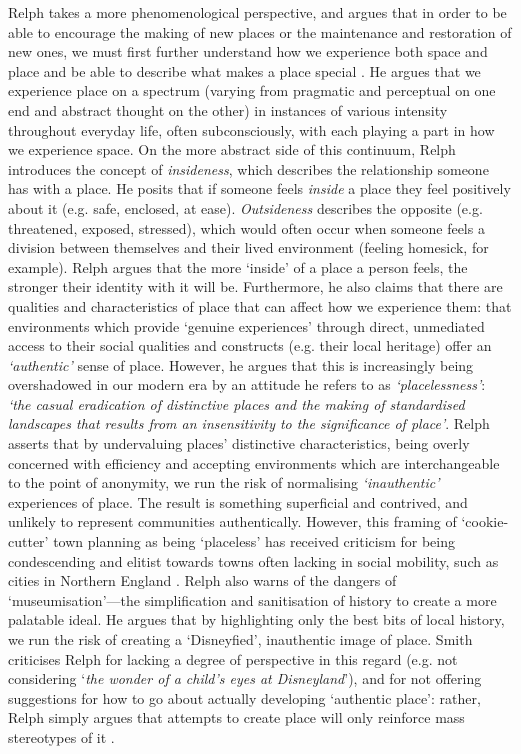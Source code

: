 Relph takes a more phenomenological perspective, and argues that in order to be able to encourage the making of new places or the maintenance and restoration of new ones, we must first further understand how we experience both space and place and be able to describe what makes a place special \citep{Relph1976}. He argues that we experience place on a spectrum (varying from pragmatic and perceptual on one end and abstract thought on the other) in instances of various intensity throughout everyday life, often subconsciously, with each playing a part in how we experience space. On the more abstract side of this continuum, Relph introduces the concept of \textit{insideness}, which describes the relationship someone has with a place. He posits that if someone feels \textit{inside} a place they feel positively about it (e.g. safe, enclosed, at ease). \textit{Outsideness} describes the opposite (e.g. threatened, exposed, stressed), which would often occur when someone feels a division between themselves and their lived environment (feeling homesick, for example). Relph argues that the more `inside' of a place a person feels, the stronger their identity with it will be. Furthermore, he also claims that there are qualities and characteristics of place that can affect how we experience them: that environments which provide `genuine experiences' through direct, unmediated access to their social qualities and constructs (e.g. their local heritage) offer an \textit{`authentic'} sense of place. However, he argues that this is increasingly being overshadowed in our modern era by an attitude he refers to as \textit{`placelessness'}: \textit{`the casual eradication of distinctive places and the making of standardised landscapes that results from an insensitivity to the significance of place'}. Relph asserts that by undervaluing places' distinctive characteristics, being overly concerned with efficiency and accepting environments which are interchangeable to the point of anonymity, we run the risk of normalising \textit{`inauthentic'} experiences of place. The result is something superficial and contrived, and unlikely to represent communities authentically. However, this framing of `cookie-cutter' town planning as being `placeless' has received criticism for being condescending and elitist towards towns often lacking in social mobility, such as cities in Northern England \citep{Cresswell2016}. Relph also warns of the dangers of `museumisation'---the simplification and sanitisation of history to create a more palatable ideal. He argues that by highlighting only the best bits of local history, we run the risk of creating a `Disneyfied', inauthentic image of place. Smith criticises Relph for lacking a degree of perspective in this regard (e.g. not considering `\textit{the wonder of a child's eyes at Disneyland}'), and for not offering suggestions for how to go about actually developing `authentic place': rather, Relph simply argues that attempts to create place will only reinforce mass stereotypes of it \citep{smith1978}.

